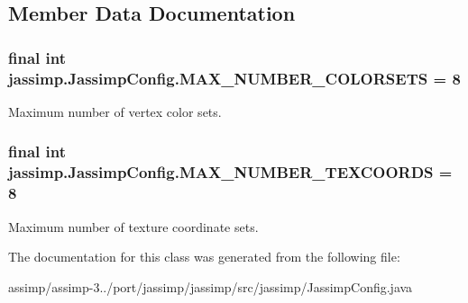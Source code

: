 \subsection{Member Data Documentation}
\hypertarget{classjassimp_1_1_jassimp_config_a11cb1067092bc9aae06a2414950af219}{
\subsubsection[{M\+A\+X\+\_\+\+N\+U\+M\+B\+E\+R\+\_\+\+C\+O\+L\+O\+R\+S\+E\+T\+S}]{\setlength{\rightskip}{0pt plus 5cm}final int jassimp.\+Jassimp\+Config.\+M\+A\+X\+\_\+\+N\+U\+M\+B\+E\+R\+\_\+\+C\+O\+L\+O\+R\+S\+E\+T\+S = 8\hspace{0.3cm}{\ttfamily [static]}}}\label{classjassimp_1_1_jassimp_config_a11cb1067092bc9aae06a2414950af219}
Maximum number of vertex color sets. \hypertarget{classjassimp_1_1_jassimp_config_af64bc93826354230113abdcbe1af475f}{
\subsubsection[{M\+A\+X\+\_\+\+N\+U\+M\+B\+E\+R\+\_\+\+T\+E\+X\+C\+O\+O\+R\+D\+S}]{\setlength{\rightskip}{0pt plus 5cm}final int jassimp.\+Jassimp\+Config.\+M\+A\+X\+\_\+\+N\+U\+M\+B\+E\+R\+\_\+\+T\+E\+X\+C\+O\+O\+R\+D\+S = 8\hspace{0.3cm}{\ttfamily [static]}}}\label{classjassimp_1_1_jassimp_config_af64bc93826354230113abdcbe1af475f}
Maximum number of texture coordinate sets. 

The documentation for this class was generated from the following file\+:\begin{DoxyCompactItemize}
\item 
assimp/assimp-\/3../port/jassimp/jassimp/src/jassimp/Jassimp\+Config.\+java\end{DoxyCompactItemize}
